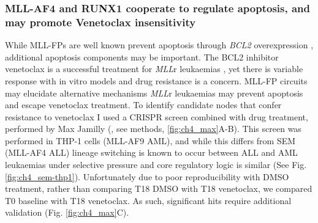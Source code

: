 \subsubsection{MLL-AF4 and RUNX1 cooperate to regulate apoptosis, and may promote Venetoclax insensitivity}

While MLL-FPs are well known prevent apoptosis through \textit{BCL2} overexpression \citep{benito_mll-rearranged_2015}, additional apoptosis components may be important. The BCL2 inhibitor venetoclax is a successful treatment for \textit{MLL}r leukaemias \citep{khaw_venetoclax_2016, vandenberg_abt-199_2013}, yet there is variable response with in vitro models \citep{pan_selective_2014} and drug resistance is a concern. MLL-FP circuits may elucidate alternative mechanisms \textit{MLL}r leukaemias may prevent apoptosis and escape venetoclax treatment. To identify candidate nodes that confer resistance to venetoclax I used a CRISPR screen combined with drug treatment, performed by Max Jamilly (\cite{harman_kmt2a-aff1_2021}, see methods, \ref{fig:ch4_max}A-B). This screen was performed in THP-1 cells (MLL-AF9 AML), and while this differs from SEM (MLL-AF4 ALL) lineage switching is known to occur between ALL and AML leukaemias under selective pressure \citep{gardner_acquisition_2016, pillai_car_2019} and core regulatory logic is similar (See Fig. \ref{fig:ch4_sem-thp1}). Unfortunately due to poor reproducibility with DMSO treatment, rather than comparing T18 DMSO with T18 venetoclax, we compared T0 baseline with T18 venetoclax. As such, significant hits require additional validation (Fig. \ref{fig:ch4_max}C). 

